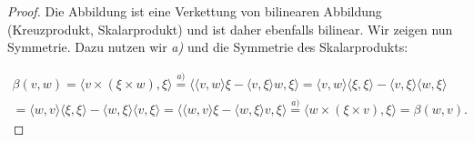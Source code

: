 \documentclass{article}
\begin{document}
 \begin{proof}
    Die Abbildung ist eine Verkettung von
    bilinearen Abbildung (Kreuzprodukt, Skalarprodukt)
    und ist daher ebenfalls bilinear.
    Wir zeigen nun Symmetrie.
    Dazu nutzen wir \textit{a)} und die Symmetrie des Skalarprodukts:

    \[
    \begin{aligned}
    \beta(v, w)
    =
    \langle v \times (\xi \times w), \xi \rangle
    \overset{a)}{=}
    \langle\langle v, w \rangle \xi - \langle v, \xi \rangle w, \xi\rangle
    =
    \langle v, w \rangle \langle \xi, \xi\rangle - \langle v, \xi \rangle \langle w, \xi \rangle
    \\
    =
    \langle w, v \rangle \langle \xi, \xi\rangle - \langle w, \xi \rangle \langle v, \xi \rangle   
    =
    \langle\langle w, v \rangle \xi - \langle w, \xi \rangle v, \xi\rangle
    \overset{a)}{=}
    \langle w \times (\xi \times v), \xi \rangle
    =
    \beta(w, v).
    \end{aligned}
    \]
 \end{proof}
\end{document}
